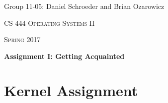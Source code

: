 \documentclass[10pt,letterpaper,draftclsnofoot,onecolumn]{IEEEtran}
\begin{document}
\begin{titlepage}
\centering
{\Large Group 11-05: Daniel Schroeder and Brian Ozarowicz\par}
\vspace{1cm}
{\scshape\Large CS 444 Operating Systems II\par}
{\scshape\Large Spring 2017\par}
\vspace{1cm}
{\huge\bfseries Assignment I: Getting Acquainted\par}
\vspace{2cm}
\begin{abstract}
This document is a summary of Assignment 1 for CS 444 Operating Systems II at Oregon State University Spring 2017. This document includes a log of commands used to complete the kernel assignment, a description of all flags in the qemu command, a description of the concurrency assignment solution from Group 11-05, and the responses to the concurrency assignment follow up questions.
\end{abstract}
\end{titlepage}

\section{Kernel Assignment}
\bigskip
\end{document}
